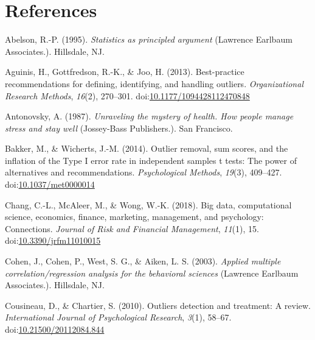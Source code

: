 \documentclass[man,floatsintext]{apa6}
\begin{document}
\newpage

\hypertarget{references}{%
\section{References}\label{references}}

\setlength{\parindent}{-0.5in}
\setlength{\leftskip}{0.5in}

\hypertarget{refs}{}
\leavevmode\hypertarget{ref-Abelson_1995}{}%
Abelson, R.-P. (1995). \emph{Statistics as principled argument} (Lawrence Earlbaum Associates.). Hillsdale, NJ.

\leavevmode\hypertarget{ref-Aguinis_et_al_2013}{}%
Aguinis, H., Gottfredson, R.-K., \& Joo, H. (2013). Best-practice recommendations for defining, identifying, and handling outliers. \emph{Organizational Research Methods}, \emph{16}(2), 270--301. doi:\href{https://doi.org/10.1177/1094428112470848}{10.1177/1094428112470848}

\leavevmode\hypertarget{ref-Antonovsky_1987}{}%
Antonovsky, A. (1987). \emph{Unraveling the mystery of health. How people manage stress and stay well} (Jossey-Bass Publishers.). San Francisco.

\leavevmode\hypertarget{ref-Bakker_and_Wicherts_2014}{}%
Bakker, M., \& Wicherts, J.-M. (2014). Outlier removal, sum scores, and the inflation of the Type I error rate in independent samples t tests: The power of alternatives and recommendations. \emph{Psychological Methods}, \emph{19}(3), 409--427. doi:\href{https://doi.org/10.1037/met0000014}{10.1037/met0000014}

\leavevmode\hypertarget{ref-Chang_et_al_2018}{}%
Chang, C.-L., McAleer, M., \& Wong, W.-K. (2018). Big data, computational science, economics, finance, marketing, management, and psychology: Connections. \emph{Journal of Risk and Financial Management}, \emph{11}(1), 15. doi:\href{https://doi.org/10.3390/jrfm11010015}{10.3390/jrfm11010015}

\leavevmode\hypertarget{ref-Cohen_et_al_2003}{}%
Cohen, J., Cohen, P., West, S. G., \& Aiken, L. S. (2003). \emph{Applied multiple correlation/regression analysis for the behavioral sciences} (Lawrence Earlbaum Associates.). Hillsdale, NJ.

\leavevmode\hypertarget{ref-Cousineau_Chartier_2010}{}%
Cousineau, D., \& Chartier, S. (2010). Outliers detection and treatment: A review. \emph{International Journal of Psychological Research}, \emph{3}(1), 58--67. doi:\href{https://doi.org/10.21500/20112084.844}{10.21500/20112084.844}
\end{document}
